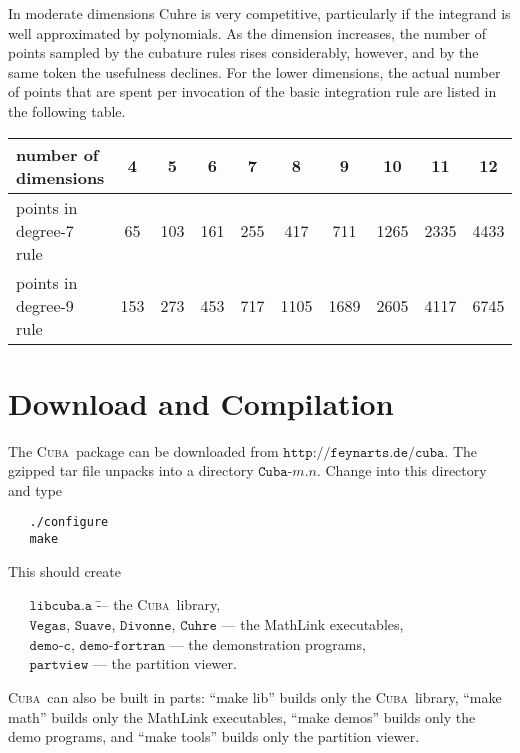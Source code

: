 \documentclass[12pt]{article}
\newcommand\cuba{\textsc{Cuba}}
\newcommand\Code[1]{\ensuremath{\texttt{#1}}}
\begin{document}
In moderate dimensions Cuhre is very competitive, particularly if the 
integrand is well approximated by polynomials.  As the dimension 
increases, the number of points sampled by the cubature rules rises 
considerably, however, and by the same token the usefulness declines.
For the lower dimensions, the actual number of points that are spent per 
invocation of the basic integration rule are listed in the following 
table.
\begin{center}
\begin{tabular}{l|ccccccccc}
number of dimensions &
	4 & 5 & 6 & 7 & 8 & 9 & 10 & 11 & 12 \\ \hline
points in degree-7 rule &
	65 & 103 & 161 & 255 & 417 & 711 & 1265 & 2335 & 4433 \\
points in degree-9 rule &
	153 & 273 & 453 & 717 & 1105 & 1689 & 2605 & 4117 & 6745
\end{tabular}
\end{center}





\section{Download and Compilation}

The \cuba\ package can be downloaded from
\Code{http://feynarts.de/cuba}.  The gzipped tar file unpacks into
a directory \Code{Cuba-$m$.$n$}.  Change into this directory and type
\begin{verbatim}
   ./configure
   make
\end{verbatim}
This should create
\begin{tabbing}
\verb=   =\Code{libcuba.a} \hspace{10em}
\= --- the \cuba\ library, \\
\verb=   =\Code{Vegas}, \Code{Suave}, \Code{Divonne}, \Code{Cuhre}
\> --- the MathLink executables, \\
\verb=   =\Code{demo-c}, \Code{demo-fortran}
\> --- the demonstration programs, \\
\verb=   =\Code{partview}
\> --- the partition viewer.
\end{tabbing}
\cuba\ can also be built in parts: ``make lib'' builds only the \cuba\
library, ``make math'' builds only the MathLink executables, ``make
demos'' builds only the demo programs, and ``make tools'' builds only 
the partition viewer.
\end{document}
